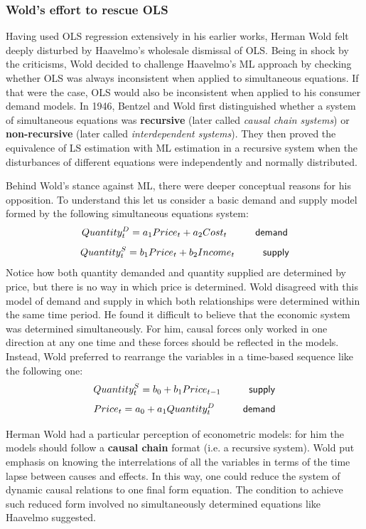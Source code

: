 \documentclass[12pt]{book}\usepackage{graphicx, color}
\begin{document}
\subsubsection*{Wold's effort to rescue OLS}
Having used OLS regression extensively in his earlier works, Herman Wold felt deeply disturbed by Haavelmo's wholesale dismissal of OLS. Being in shock by the criticisms, Wold decided to challenge Haavelmo's ML approach by checking whether OLS was always inconsistent when applied to simultaneous equations. If that were the case, OLS would also be inconsistent when applied to his consumer demand models. In 1946, Bentzel and Wold first distinguished whether a system of simultaneous equations was \textbf{recursive} (later called \textit{causal chain systems}) or \textbf{non-recursive} (later called \textit{interdependent systems}). They then proved the equivalence of LS estimation with ML estimation in a recursive system when the disturbances of different equations were independently and normally distributed.

Behind Wold's stance against ML, there were deeper conceptual reasons for his opposition. To understand this let us consider a basic demand and supply model formed by the following simultaneous equations system:
$$ Quantity_t^D = a_1 Price_t + a_2 Cost_t  \hspace{10mm}  \mathsf{demand} $$
$$ Quantity_t^S = b_1 Price_t + b_2 Income_t  \hspace{10mm}  \mathsf{supply} $$
Notice how both quantity demanded and quantity supplied are determined by price, but there is no way in which price is determined. Wold disagreed with this model of demand and supply in which both relationships were determined within the same time period. He found it difficult to believe that the economic system was determined simultaneously. For him, causal forces only worked in one direction at any one time and these forces should be reflected in the models. Instead, Wold preferred to rearrange the variables in a time-based sequence like the following one:
$$ Quantity_t^S = b_0 + b_1 Price_{t-1}  \hspace{10mm}  \mathsf{supply} $$
$$ Price_t = a_0 + a_1 Quantity_t^D  \hspace{10mm}  \mathsf{demand} $$

Herman Wold had a particular perception of econometric models: for him the models should follow a \textbf{causal chain} format (i.e. a recursive system). Wold put emphasis on knowing the interrelations of all the variables in terms of the time lapse between causes and effects. In this way, one could reduce the system of dynamic causal relations to one final form equation. The condition to achieve such reduced form involved no simultaneously determined equations like Haavelmo suggested.
\end{document}

